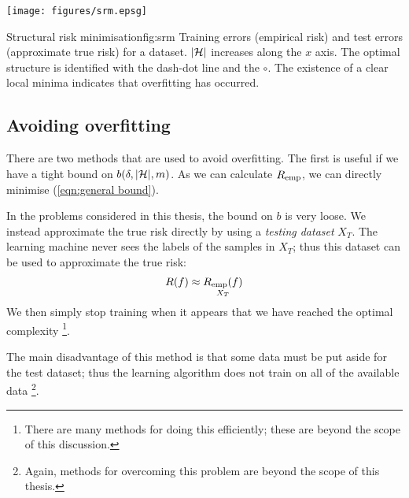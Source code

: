 \begin{linefigure}
\begin{center}
\texttt{[image: figures/srm.epsg]}
\end{center}
\begin{capt}{Structural risk minimisation}{fig:srm}
Training errors (empirical risk) and test errors (approximate true
risk) for a dataset.  $|\mathcal{H}|$ increases along the $x$ axis.
The optimal structure is identified with the dash-dot line and the
$\circ$.  The existence of a clear local minima indicates that
overfitting has occurred.
\end{capt}
\end{linefigure}


\subsection{Avoiding overfitting}

There are two methods that are used to avoid overfitting.  The first
is useful if we have a tight bound on $b(\delta, |\mathcal{H}|, m)$.  As we
can calculate $R_{\mathrm{emp}}$, we can directly minimise (\ref{eqn:general
bound}).

In the problems considered in this thesis, the bound on $b$ is very
loose.  We instead approximate the true risk directly by using a
\emph{testing dataset} $X_T$.  The learning machine never sees the
labels of the samples in $X_T$; thus this dataset can be used to
approximate the true risk:
%
\begin{equation}
R(f) \approx \underset{X_T}{R_{\mathrm{emp}}(f)}
\end{equation}
%
We then simply stop training when it appears that we have reached the
optimal complexity%
\footnote{There are many methods for doing this efficiently;
these are beyond the scope of this discussion.}.

The main disadvantage of this method is that some data must be put
aside for the test dataset; thus the learning algorithm does not train
on all of the available data%
\footnote{Again, methods for overcoming this problem are beyond the
scope of this thesis.}.

